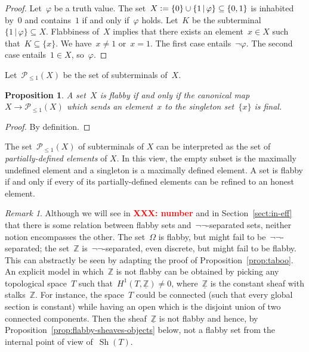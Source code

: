 \documentclass[oneside]{amsart}
\theoremstyle{definition}
\theoremstyle{plain}
\newtheorem{prop}[defn]{Proposition}
\theoremstyle{remark}
\newtheorem{rem}[defn]{Remark}
\newcommand{\XXX}[1]{\textbf{\textcolor{red}{XXX: #1}}}
\newcommand{\ZZ}{\mathbb{Z}}
\renewcommand{\P}{\mathcal{P}}
\newcommand{\defeq}{\vcentcolon=}
\DeclareMathOperator{\Sh}{Sh}
\renewcommand{\_}{\mathpunct{.}\,}
\begin{document}
\begin{proof}Let~$\varphi$ be a truth value. The set~$X \defeq \{ 0 \}
\cup \{ 1 \,|\, \varphi \} \subseteq \{ 0,1 \}$ is inhabited by~$0$ and
contains~$1$ if and only if~$\varphi$ holds. Let~$K$ be the subterminal~$\{ 1 \,|\, \varphi
\} \subseteq X$. Flabbiness of~$X$ implies that there exists an element~$x \in
X$ such that~$K \subseteq \{x\}$. We have~$x \neq 1$ or~$x = 1$. The first case
entails~$\neg\varphi$. The second case entails~$1 \in X$, so~$\varphi$.
\end{proof}

Let~$\P_{\leq 1}(X)$ be the set of subterminals of~$X$.

\begin{prop}A set~$X$ is flabby if and only if the canonical map~$X \to
\P_{\leq 1}(X)$ which sends an element~$x$ to the singleton set~$\{x\}$ is
final.
\end{prop}

\begin{proof}By definition.\end{proof}

The set~$\P_{\leq 1}(X)$ of subterminals of $X$ can be interpreted as the set
of \emph{partially-defined elements} of $X$. In this view, the empty subset is
the maximally undefined element and a singleton is a maximally defined element.
A set is flabby if and only if every of its partially-defined elements can be
refined to an honest element.

\begin{rem}\label{rem:constant-flabby}
Although we will see in \XXX{number} and in Section~\ref{sect:in-eff} that there is some
relation between flabby sets and~$\neg\neg$-separated sets, neither notion
encompasses the other. The set~$\Omega$ is flabby, but might fail to
be~$\neg\neg$-separated; the set~$\ZZ$ is~$\neg\neg$-separated, even discrete,
but might fail to be flabby. This can abstractly be seen by adapting the proof of
Proposition~\ref{prop:taboo}. An explicit model in which~$\ZZ$ is not flabby
can be obtained by picking any topological space~$T$ such that~$H^1(T,
\underline{\ZZ}) \neq 0$, where~$\underline{\ZZ}$ is the constant sheaf with
stalks~$\ZZ$. For instance, the space~$T$ could be connected (such that every
global section is constant) while having an open which is the disjoint union of
two connected components. Then the sheaf~$\underline{\ZZ}$ is not
flabby and hence, by Proposition~\ref{prop:flabby-sheaves-objects} below, not a
flabby set from the internal point of view of~$\Sh(T)$.
\end{rem}
\end{document}
